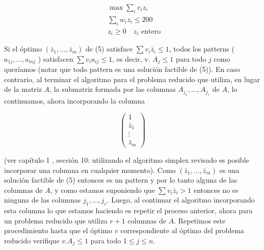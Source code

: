 \documentclass[10pt]{article}
\begin{document}
\begin{align*}
& \max \sum_{i} v_{i} z_{i} \\
& \sum_{i} w_{i} z_{i} \leq 200  \tag{5}\\
& z_{i} \geq 0 \quad z_{i} \text { entero }
\end{align*}


Si el óptimo $\left(\bar{z}_{1}, \ldots, \bar{z}_{m}\right)$ de (5) satisface $\sum v_{i} \bar{z}_{i} \leq 1$, todos los patterns ( $a_{1 j}, \ldots, a_{m j}$ ) satisfacen $\sum v_{i} a_{i j} \leq 1$, es decir, v. $A_{j} \leq 1$ para todo $j$ como queríamos (notar que todo pattern es una solución factible de (5)). En caso contrario, al terminar el algoritmo para el problema reducido que utiliza, en lugar de la matriz $A$, la submatriz formada por las columnas $A_{j_{1}}, \ldots, A_{j_{r}}$ de $A$, lo continuamos, ahora incorporando la columna

$$
\left(\begin{array}{c}
1 \\
\bar{z}_{1} \\
\vdots \\
\bar{z}_{m}
\end{array}\right)
$$

(ver capítulo 1 , sección 10: utilizando el algoritmo simplex revisado es posible incorporar una columna en cualquier momento). Como $\left(\bar{z}_{1}, \ldots, \bar{z}_{m}\right)$ es una solución factible de (5) entonces es un pattern y por lo tanto alguna de las columnas de $A$, y como estamos suponiendo que $\sum v_{i} \bar{z}_{i}>1$ entonces no es ninguna de las columnas $j_{1}, \ldots, j_{r}$. Luego, al continuar el algoritmo incorporando esta columna lo que estamos haciendo es repetir el proceso anterior, ahora para un problema reducido que utiliza $r+1$ columnas de $A$. Repetimos este procedimiento hasta que el óptimo $v$ correspondiente al óptimo del problema reducido verifique $v . A_{j} \leq 1$ para todo $1 \leq j \leq n$.
\end{document}
